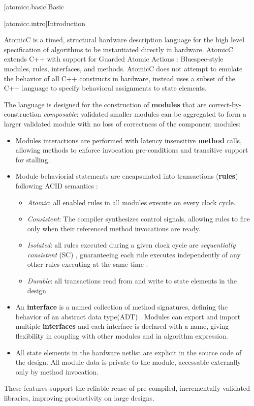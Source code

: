 [atomicc.basic]{Basic}

[atomicc.intro]{Introduction}

AtomicC is a timed, structural hardware description language for
the high level specification of algorithms to be instantiated
directly in hardware.
AtomicC extends C++
with support for Guarded Atomic Actions
\cite{Hoe:Thesis,HoeArvind:TRS_Synthesis2,Dave2007}:
Bluespec-style\cite{Bluespec:www}
modules, rules, interfaces, and methods.
AtomicC does not attempt to emulate the behavior of all C++ constructs in hardware,
instead uses a subset of the C++ language to specify behavioral
assignments to state elements.

The language is designed for
the construction of \textbf{modules} that are correct-by-construction \textit{composable}:
validated smaller modules can be aggregated to form
a larger validated module with
no loss of correctness of the component modules:
\begin{itemize}
\item Modules interactions are performed with
latency insensitive\cite{Ng2010,AbbasB18}
\textbf{method} calls, allowing methods to enforce invocation pre-conditions
and transitive support for stalling.
\item Module behaviorial statements are encapsulated into transactions (\textbf{rules})
following ACID semantics
\cite{NikhilSemantics,GrayR93}:
\begin{itemize}
\item \textit{Atomic}: all enabled rules in all modules execute on every clock cycle.
\item \textit{Consistent}: The compiler synthesizes control signals, allowing rules to fire
only when their referenced method invocations are ready.
\item \textit{Isolated}: all rules executed during a given clock cycle are
\textit{sequentially consistent} (SC) \cite{Lamport:1979:MMC:1311099.1311750},
guaranteeing each rule executes
independently of any other rules executing at the same time
\cite[Sec.~7.1]{GrayR93}.
\item \textit{Durable}: all transactions read from and write to state elements in the design
\end{itemize}

\item An \textbf{interface} is a named collection of method signatures, defining
the behavior of an abstract data type(ADT) \cite{Liskov74programmingwith}.
Modules can export and import
multiple \textbf{interfaces} and each interface is declared with a name,
giving flexibility in coupling with other modules and in algorithm expression.
\item All state elements in the hardware
netlist are explicit in the source code of the design.
All module data is private to the module, accessable externally only by method invocation.
\end{itemize}
These features support the reliable reuse of pre-compiled, incrementally validated
libraries, improving productivity on large designs.

